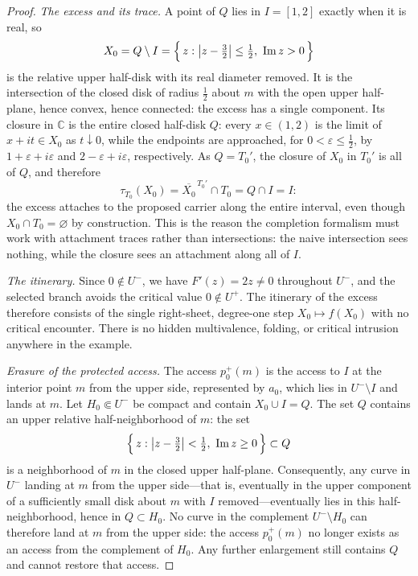 \documentclass[11pt,reqno]{amsart}
\theoremstyle{definition}
\theoremstyle{remark}
\newcommand{\C}{\mathbb C}
\begin{document}
\begin{proof}
\emph{The excess and its trace.}
A point of $Q$ lies in $I=[1,2]$ exactly when it is real, so
\[
X_0=Q\setminus I
=\Bigl\{\,z:\bigl|z-\tfrac32\bigr|\le\tfrac12,\ \operatorname{Im}z>0\,\Bigr\}
\]
is the relative upper half-disk with its real diameter removed. It is the
intersection of the closed disk of radius $\tfrac12$ about $m$ with the open
upper half-plane, hence convex, hence connected: the excess has a single
component. Its closure in $\C$ is the entire closed half-disk
$Q$: every $x\in(1,2)$ is the limit of $x+it\in X_0$ as
$t\downarrow0$, while the endpoints are approached, for
$0<\varepsilon\le\tfrac12$, by
$1+\varepsilon+i\varepsilon$ and
$2-\varepsilon+i\varepsilon$, respectively.  As $Q=T_0'$, the closure of
$X_0$ in $T_0'$ is all of $Q$,
and therefore
\[
\tau_{T_0}(X_0)=\overline{X_0}^{\,T_0'}\cap T_0=Q\cap I=I:
\]
the excess attaches to the proposed carrier along the entire interval, even
though $X_0\cap T_0=\varnothing$ by construction. This is the reason the
completion formalism must work with attachment traces rather than
intersections: the naive intersection sees nothing, while the closure sees an
attachment along all of $I$.

\emph{The itinerary.}
Since $0\notin U^{-}$, we have $F'(z)=2z\ne 0$ throughout $U^{-}$, and the
selected branch avoids the critical value $0\notin U^{+}$. The itinerary of
the excess therefore consists of the single right-sheet, degree-one step
$X_0\mapsto f(X_0)$ with no critical encounter.
There is no hidden multivalence, folding, or critical intrusion anywhere in
the example.

\emph{Erasure of the protected access.}
The access $p_0^{+}(m)$ is the access to $I$ at the interior point $m$ from
the upper side, represented by $a_0$, which lies in
$U^{-}\setminus I$ and lands at $m$.  Let
$H_0\Subset U^{-}$ be compact and contain $X_0\cup I=Q$.  The set $Q$ contains an
upper relative half-neighborhood of $m$: the set
\[
\Bigl\{\,z:\bigl|z-\tfrac32\bigr|<\tfrac12,\ \operatorname{Im}z\ge 0\,\Bigr\}
\subset Q
\]
is a neighborhood of $m$ in the closed upper half-plane. Consequently, any
curve in $U^{-}$ landing at $m$ from the upper side---that is, eventually
in the upper component of a sufficiently small disk about $m$ with $I$
removed---eventually lies in this half-neighborhood, hence in $Q\subset H_0$.
No curve in the complement $U^{-}\setminus H_0$ can therefore land at $m$ from the upper
side: the access $p_0^{+}(m)$ no longer exists as an access from the
complement of $H_0$.  Any further enlargement still contains $Q$ and
cannot restore that access.


\end{proof}
\end{document}

